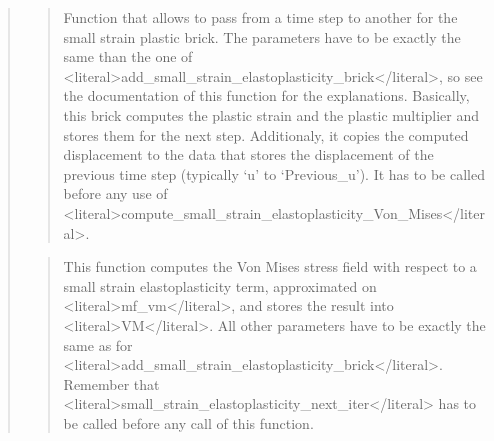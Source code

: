 \documentclass[a4paper,11pt,english]{sphinxmanual}
\begin{document}
\begin{quote}
\sphinxAtStartPar
{}
\begin{quote}

\sphinxAtStartPar
Function that allows to pass from a time step to another for the
small strain plastic brick. The parameters have to be exactly the
same than the one of \textless{}literal\textgreater{}add\_small\_strain\_elastoplasticity\_brick\textless{}/literal\textgreater{},
so see the documentation of this function for the explanations.
Basically, this brick computes the plastic strain
and the plastic multiplier and stores them for the next step.
Additionaly, it copies the computed displacement to the data
that stores the displacement of the previous time step (typically
‘u’ to ‘Previous\_u’). It has to be called before any use of
\textless{}literal\textgreater{}compute\_small\_strain\_elastoplasticity\_Von\_Mises\textless{}/literal\textgreater{}.
\end{quote}

\sphinxAtStartPar
{}
\begin{quote}

\sphinxAtStartPar
This function computes the Von Mises stress field with respect to
a small strain elastoplasticity term, approximated on \textless{}literal\textgreater{}mf\_vm\textless{}/literal\textgreater{},
and stores the result into \textless{}literal\textgreater{}VM\textless{}/literal\textgreater{}.  All other parameters have to be
exactly the same as for \textless{}literal\textgreater{}add\_small\_strain\_elastoplasticity\_brick\textless{}/literal\textgreater{}.
Remember that \textless{}literal\textgreater{}small\_strain\_elastoplasticity\_next\_iter\textless{}/literal\textgreater{} has to be called
before any call of this function.
\end{quote}


\end{quote}
\end{document}
